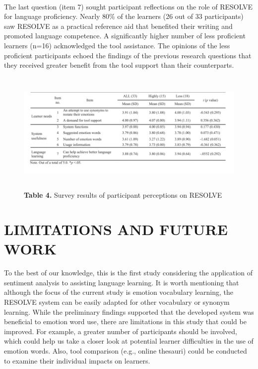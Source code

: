 \documentclass[a4paper,12pt,oneside]{article}
\let\counterwithin\relax
\begin{document}
\paragraph{}
The last question (item 7) sought participant reflections on the role of RESOLVE for language proficiency. Nearly 80\% of the learners (26 out of 33 participants) saw RESOLVE as a practical reference aid that benefited their writing and promoted language competence. A significantly higher number of less proficient learners (n=16) acknowledged the tool assistance. The opinions of the less proficient participants echoed the findings of the previous research questions that they received greater benefit from the tool support than their counterparts. 

\begin{figure}[H]
\includegraphics[height=5.9cm,width=15.4cm]{Table4.png}
\centering
\caption{\textbf{Table 4.} Survey results of participant perceptions on RESOLVE}
\end{figure}

\newpage
\section{LIMITATIONS AND FUTURE WORK}
To the best of our knowledge, this is the first study considering the application of sentiment analysis to assisting language learning. It is worth mentioning that although the focus of the current study is emotion vocabulary learning, the RESOLVE system can be easily adapted for other vocabulary or synonym learning. While the preliminary findings supported that the developed system was beneficial to emotion word use, there are limitations in this study that could be improved. For example, a greater number of participants should be involved, which could help us take a closer look at potential learner difficulties in the use of emotion words. Also, tool comparison (e.g., online thesauri) could be conducted to examine their individual impacts on learners. 
\end{document}
